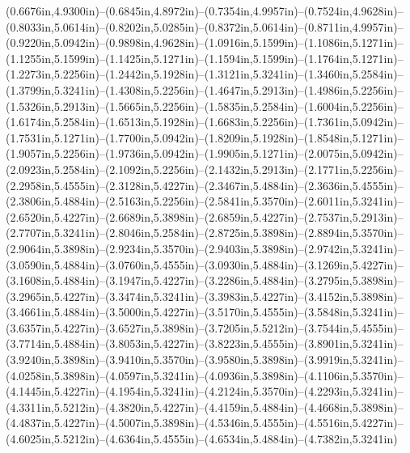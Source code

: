 (0.6676in,4.9300in)--(0.6845in,4.8972in)--(0.7354in,4.9957in)--(0.7524in,4.9628in)--(0.8033in,5.0614in)--(0.8202in,5.0285in)--(0.8372in,5.0614in)--(0.8711in,4.9957in)--(0.9220in,5.0942in)--(0.9898in,4.9628in)--(1.0916in,5.1599in)--(1.1086in,5.1271in)--(1.1255in,5.1599in)--(1.1425in,5.1271in)--(1.1594in,5.1599in)--(1.1764in,5.1271in)--(1.2273in,5.2256in)--(1.2442in,5.1928in)--(1.3121in,5.3241in)--(1.3460in,5.2584in)--(1.3799in,5.3241in)--(1.4308in,5.2256in)--(1.4647in,5.2913in)--(1.4986in,5.2256in)--(1.5326in,5.2913in)--(1.5665in,5.2256in)--(1.5835in,5.2584in)--(1.6004in,5.2256in)--(1.6174in,5.2584in)--(1.6513in,5.1928in)--(1.6683in,5.2256in)--(1.7361in,5.0942in)--(1.7531in,5.1271in)--(1.7700in,5.0942in)--(1.8209in,5.1928in)--(1.8548in,5.1271in)--(1.9057in,5.2256in)--(1.9736in,5.0942in)--(1.9905in,5.1271in)--(2.0075in,5.0942in)--(2.0923in,5.2584in)--(2.1092in,5.2256in)--(2.1432in,5.2913in)--(2.1771in,5.2256in)--(2.2958in,5.4555in)--(2.3128in,5.4227in)--(2.3467in,5.4884in)--(2.3636in,5.4555in)--(2.3806in,5.4884in)--(2.5163in,5.2256in)--(2.5841in,5.3570in)--(2.6011in,5.3241in)--(2.6520in,5.4227in)--(2.6689in,5.3898in)--(2.6859in,5.4227in)--(2.7537in,5.2913in)--(2.7707in,5.3241in)--(2.8046in,5.2584in)--(2.8725in,5.3898in)--(2.8894in,5.3570in)--(2.9064in,5.3898in)--(2.9234in,5.3570in)--(2.9403in,5.3898in)--(2.9742in,5.3241in)--(3.0590in,5.4884in)--(3.0760in,5.4555in)--(3.0930in,5.4884in)--(3.1269in,5.4227in)--(3.1608in,5.4884in)--(3.1947in,5.4227in)--(3.2286in,5.4884in)--(3.2795in,5.3898in)--(3.2965in,5.4227in)--(3.3474in,5.3241in)--(3.3983in,5.4227in)--(3.4152in,5.3898in)--(3.4661in,5.4884in)--(3.5000in,5.4227in)--(3.5170in,5.4555in)--(3.5848in,5.3241in)--(3.6357in,5.4227in)--(3.6527in,5.3898in)--(3.7205in,5.5212in)--(3.7544in,5.4555in)--(3.7714in,5.4884in)--(3.8053in,5.4227in)--(3.8223in,5.4555in)--(3.8901in,5.3241in)--(3.9240in,5.3898in)--(3.9410in,5.3570in)--(3.9580in,5.3898in)--(3.9919in,5.3241in)--(4.0258in,5.3898in)--(4.0597in,5.3241in)--(4.0936in,5.3898in)--(4.1106in,5.3570in)--(4.1445in,5.4227in)--(4.1954in,5.3241in)--(4.2124in,5.3570in)--(4.2293in,5.3241in)--(4.3311in,5.5212in)--(4.3820in,5.4227in)--(4.4159in,5.4884in)--(4.4668in,5.3898in)--(4.4837in,5.4227in)--(4.5007in,5.3898in)--(4.5346in,5.4555in)--(4.5516in,5.4227in)--(4.6025in,5.5212in)--(4.6364in,5.4555in)--(4.6534in,5.4884in)--(4.7382in,5.3241in) 